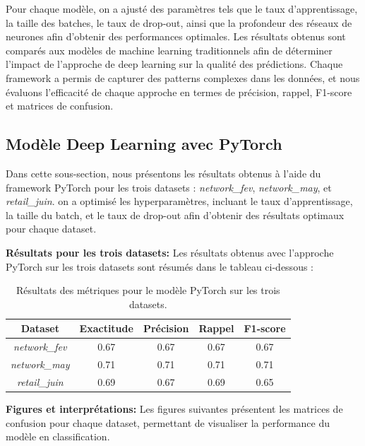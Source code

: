 Pour chaque modèle, on a ajusté des paramètres tels que le taux d'apprentissage, la taille des batches, le taux de drop-out, ainsi que la profondeur des réseaux de neurones afin d'obtenir des performances optimales. Les résultats obtenus sont comparés aux modèles de machine learning traditionnels afin de déterminer l'impact de l'approche de deep learning sur la qualité des prédictions. Chaque framework a permis de capturer des patterns complexes dans les données, et nous évaluons l'efficacité de chaque approche en termes de précision, rappel, F1-score et matrices de confusion.


\subsection{Modèle Deep Learning avec PyTorch}

Dans cette sous-section, nous présentons les résultats obtenus à l'aide du framework PyTorch pour les trois datasets : \textit{network\_fev}, \textit{network\_may}, et \textit{retail\_juin}. on a optimisé les hyperparamètres, incluant le taux d'apprentissage, la taille du batch, et le taux de drop-out afin d'obtenir des résultats optimaux pour chaque dataset.

\textbf{Résultats pour les trois datasets:} Les résultats obtenus avec l'approche PyTorch sur les trois datasets sont résumés dans le tableau ci-dessous :

\begin{table}[H]
    \centering
    \begin{tabular}{|c|c|c|c|c|}
        \hline
        \textbf{Dataset} & \textbf{Exactitude} & \textbf{Précision} & \textbf{Rappel} & \textbf{F1-score} \\
        \hline
        \textit{network\_fev} & 0.67 & 0.67 & 0.67 & 0.67 \\
        \textit{network\_may} & 0.71 & 0.71 & 0.71 & 0.71 \\
        \textit{retail\_juin} & 0.69 & 0.67 & 0.69 & 0.65 \\
        \hline
    \end{tabular}
    \caption{Résultats des métriques pour le modèle PyTorch sur les trois datasets.}
\end{table}

\textbf{Figures et interprétations:} Les figures suivantes présentent les matrices de confusion pour chaque dataset, permettant de visualiser la performance du modèle en classification.

